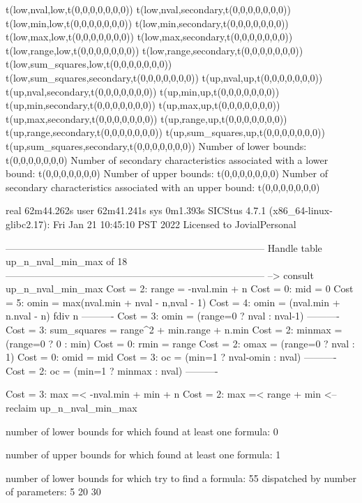 t(low,nval,low,t(0,0,0,0,0,0,0))
t(low,nval,secondary,t(0,0,0,0,0,0,0))
t(low,min,low,t(0,0,0,0,0,0,0))
t(low,min,secondary,t(0,0,0,0,0,0,0))
t(low,max,low,t(0,0,0,0,0,0,0))
t(low,max,secondary,t(0,0,0,0,0,0,0))
t(low,range,low,t(0,0,0,0,0,0,0))
t(low,range,secondary,t(0,0,0,0,0,0,0))
t(low,sum_squares,low,t(0,0,0,0,0,0,0))
t(low,sum_squares,secondary,t(0,0,0,0,0,0,0))
t(up,nval,up,t(0,0,0,0,0,0,0))
t(up,nval,secondary,t(0,0,0,0,0,0,0))
t(up,min,up,t(0,0,0,0,0,0,0))
t(up,min,secondary,t(0,0,0,0,0,0,0))
t(up,max,up,t(0,0,0,0,0,0,0))
t(up,max,secondary,t(0,0,0,0,0,0,0))
t(up,range,up,t(0,0,0,0,0,0,0))
t(up,range,secondary,t(0,0,0,0,0,0,0))
t(up,sum_squares,up,t(0,0,0,0,0,0,0))
t(up,sum_squares,secondary,t(0,0,0,0,0,0,0))
Number of lower bounds:                                             t(0,0,0,0,0,0,0)
Number of secondary characteristics associated with a lower bound:  t(0,0,0,0,0,0,0)
Number of upper bounds:                                             t(0,0,0,0,0,0,0)
Number of secondary characteristics associated with an upper bound: t(0,0,0,0,0,0,0)

real	62m44.262s
user	62m41.241s
sys	0m1.393s
SICStus 4.7.1 (x86_64-linux-glibc2.17): Fri Jan 21 10:45:10 PST 2022
Licensed to JovialPersonal


--------------------------------------------------------------------------------
Handle table up_n_nval_min_max of 18
--------------------------------------------------------------------------------
--> consult up_n_nval_min_max
Cost =  2:  range       = -nval.min + n
Cost =  0:  mid         = 0
Cost =  5:  omin        = max(nval.min + nval - n,nval - 1)
Cost =  4:  omin        = (nval.min + n.nval - n) fdiv n
----------
Cost =  3:  omin        = (range=0 ? nval : nval-1)
----------
Cost =  3:  sum_squares = range^2 + min.range + n.min
Cost =  2:  minmax      = (range=0 ? 0 : min)
Cost =  0:  rmin        = range
Cost =  2:  omax        = (range=0 ? nval : 1)
Cost =  0:  omid        = mid
Cost =  3:  oc          = (min=1 ? nval-omin : nval)
----------
Cost =  2:  oc          = (min=1 ? minmax : nval)
----------

Cost =  3:  max =< -nval.min + min + n
Cost =  2:  max =< range + min
<-- reclaim up_n_nval_min_max

number of lower bounds for which found at least one formula: 0

number of upper bounds for which found at least one formula: 1

number of lower bounds for which try to find a formula: 55
dispatched by number of parameters: 5  20  30

